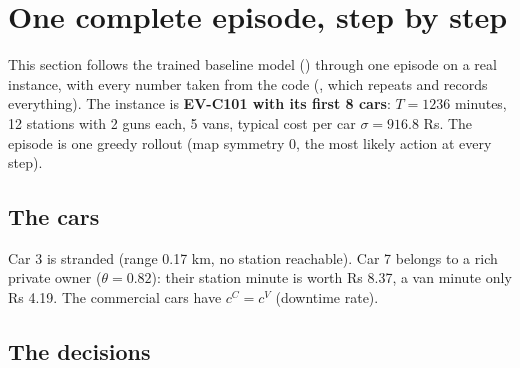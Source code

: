 \section{One complete episode, step by step}
\label{sec:trace}

This section follows the trained baseline model () through one episode on a real instance, with every number taken from the code (, which repeats  and records everything). The instance is \textbf{EV-C101 with its first 8 cars}: $T=1236$ minutes, 12 stations with 2 guns each, 5 vans, typical cost per car $\sigma=916.8$ Rs. The episode is one greedy rollout (map symmetry 0, the most likely action at every step).

\subsection{The cars}

\begin{table}[H]
\centering
\caption{The 8 cars: segment, income, request minute $r_i$, energy $E_i$ (kWh), range $R_i$ (km), reachable stations, queue tolerance $W_i$ (min), money sensitivity $\mu_i$, values of time $c^Q_i$, $c^C_i$, $c^V_i$ (Rs/min), charging minutes at a gun and by a van.}

\end{table}

Car 3 is stranded (range 0.17 km, no station reachable). Car 7 belongs to a rich private owner ($\theta=0.82$): their station minute is worth Rs 8.37, a van minute only Rs 4.19. The commercial cars have $c^C=c^V$ (downtime rate).

\subsection{The decisions}

\begin{table}[H]
\centering
\caption{The 8 steps. ``open'' = cars with at least one allowed resource; the three largest car probabilities $p(i)$; the chosen car and resource with their probabilities; start, finish, cost increase and the running total.}

\end{table}

